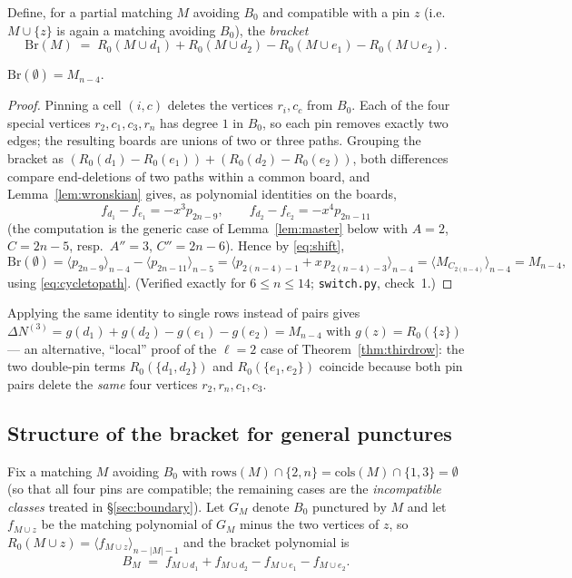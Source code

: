 Define, for a partial matching $M$ avoiding $B_0$ and compatible with a
pin $z$ (i.e.\ $M\cup\{z\}$ is again a matching avoiding $B_0$), the
\emph{bracket}
\[
\mathrm{Br}(M)\;=\;R_0(M\cup d_1)+R_0(M\cup d_2)-R_0(M\cup e_1)-R_0(M\cup e_2).
\]

\begin{proposition}\label{prop:S0}
$\mathrm{Br}(\emptyset)=M_{n-4}$.
\end{proposition}

\begin{proof}
Pinning a cell $(i,c)$ deletes the vertices $r_i,c_c$ from $B_0$.  Each
of the four special vertices $r_2,c_1,c_3,r_n$ has degree $1$ in $B_0$,
so each pin removes exactly two edges; the resulting boards are unions of
two or three paths.  Grouping the bracket as
$(R_0(d_1)-R_0(e_1))+(R_0(d_2)-R_0(e_2))$, both differences compare
end-deletions of two paths within a common board, and
Lemma~\ref{lem:wronskian} gives, as polynomial identities on the boards,
\[
f_{d_1}-f_{e_1}=-x^3p_{2n-9},\qquad
f_{d_2}-f_{e_2}=-x^4p_{2n-11}
\]
(the computation is the generic case of Lemma~\ref{lem:master} below with
$A=2$, $C=2n-5$, resp.\ $A''=3$, $C''=2n-6$).  Hence by \eqref{eq:shift},
\[
\mathrm{Br}(\emptyset)
=\langle p_{2n-9}\rangle_{n-4}-\langle p_{2n-11}\rangle_{n-5}
=\bigl\langle p_{2(n-4)-1}+x\,p_{2(n-4)-3}\bigr\rangle_{n-4}
=\langle M_{C_{2(n-4)}}\rangle_{n-4}=M_{n-4},
\]
using \eqref{eq:cycletopath}.  (Verified exactly for $6\le n\le14$;
\texttt{switch.py}, check~1.)
\end{proof}

Applying the same identity to single rows instead of pairs gives
$\Delta N^{(3)}=g(d_1)+g(d_2)-g(e_1)-g(e_2)=M_{n-4}$ with
$g(z)=R_0(\{z\})$ --- an alternative, ``local'' proof of the $\ell=2$
case of Theorem~\ref{thm:thirdrow}: the two double-pin terms
$R_0(\{d_1,d_2\})$ and $R_0(\{e_1,e_2\})$ coincide because both pin pairs
delete the \emph{same} four vertices $r_2,r_n,c_1,c_3$.

\subsection{Structure of the bracket for general punctures}

Fix a matching $M$ avoiding $B_0$ with $\mathrm{rows}(M)\cap\{2,n\}=
\mathrm{cols}(M)\cap\{1,3\}=\emptyset$ (so that all four pins are
compatible; the remaining cases are the \emph{incompatible classes}
treated in \S\ref{sec:boundary}).  Let $G_M$ denote $B_0$ punctured by
$M$ and let $f_{M\cup z}$ be the matching polynomial of $G_M$ minus the
two vertices of $z$, so $R_0(M\cup z)=\langle f_{M\cup z}\rangle_{n-|M|-1}$
and the bracket polynomial is
\[
B_M\;=\;f_{M\cup d_1}+f_{M\cup d_2}-f_{M\cup e_1}-f_{M\cup e_2}.
\]

